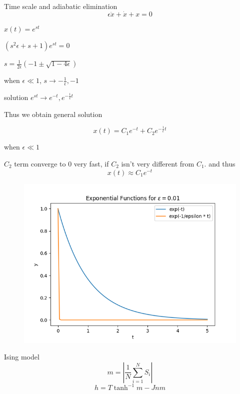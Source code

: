 \documentclass[9pt,aspectratio=43,mathserif,table]{beamer}
\begin{document}
\begin{frame}{Time scale and adiabatic elimination}
  $$\epsilon \ddot x + \dot x + x = 0$$


  \begin{multicols}{2}
    $x(t) = e^{st}$

    $(s^2 \epsilon + s + 1)e^{st} = 0$

    $s = \frac{ 1}{2\epsilon}( -1 \pm \sqrt{1 - 4 \epsilon })$

    when $\epsilon \ll 1$, $s \rightarrow -\frac{ 1}{\epsilon}, -1$

    solution $e^{st} \rightarrow e^{-t}, e^{-\frac{ 1}{\epsilon} t} $
    
    Thus we obtain general solution 

    $$x(t) = C_1 e^{-t} + C_2e^{-\frac{ 1}{\epsilon}t}$$

    \medskip

    when $\epsilon \ll 1$ 

    $C_2$ term converge to 0 very fast, if $C_2$ isn't very different from $C_1$. and thus 
    $$x(t) \approx C_1 e^{-t}$$

    \begin{figure}[!h]
      \centering
      \includegraphics[width=.5\textwidth]{fig/3.5.6epsilon.png}
    \end{figure}
 
  \end{multicols}
\end{frame}


\begin{frame}{ Ising model}
$$\displaystyle  m = |\frac{ 1}{N} \sum_{i=1}^N S_i |$$
   $$h = T \tanh^{-1}m - J n m$$
\end{frame}
\end{document}
